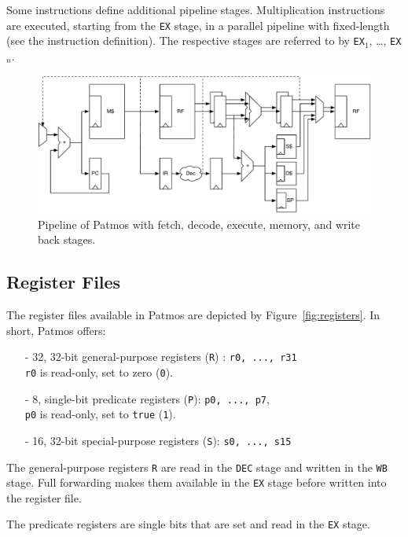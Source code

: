 \documentclass{IEEEtran}
\newcommand{\code}[1]{{\texttt{#1}}}
\begin{document}
Some instructions define additional pipeline stages. Multiplication instructions
are executed, starting from the \texttt{EX} stage, in a parallel pipeline with
fixed-length (see the instruction definition). The respective stages are
referred to by \texttt{EX$_1$}, \dots, \texttt{EX$_n$}.

\begin{figure}
    \centering
    \includegraphics[scale=0.6]{fig/pipeline}
    \caption{Pipeline of Patmos with fetch, decode, execute, memory, and write back stages.}\label{fig:pipeline}
\end{figure}


\subsection{Register Files}

The register files available in Patmos are depicted by
Figure~\ref{fig:registers}. In short, Patmos offers:
\begin{itemize}
  \item [-] 32, 32-bit general-purpose registers (\texttt{R}) : \verb!r0, ..., r31! \\
            \verb!r0! is read-only, set to zero (\texttt{0}).
  \item [-] 8, single-bit predicate registers (\texttt{P}): \verb!p0, ..., p7!, \\
            \verb!p0! is read-only, set to \texttt{true} (\texttt{1}).
  \item [-] 16, 32-bit special-purpose registers (\texttt{S}): \verb!s0, ..., s15!
\end{itemize}

The general-purpose registers \texttt{R} are read in the \code{DEC} stage
and written in the \code{WB} stage. Full forwarding makes them available
in the \code{EX} stage before written into the register file.

The predicate registers are single bits that are set and read in the \code{EX}
stage.
\end{document}
